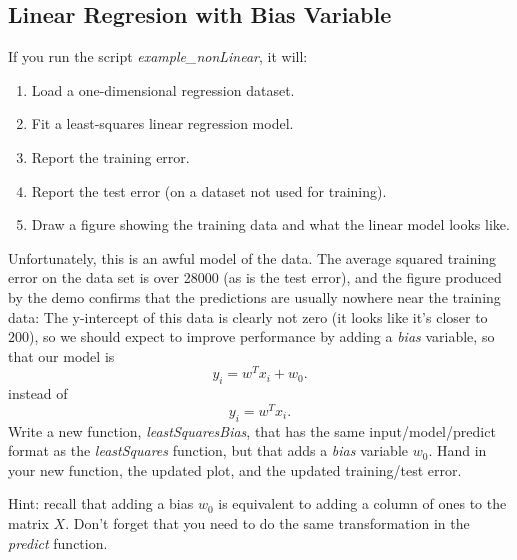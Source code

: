 \documentclass{article}
\def\blu#1{{\color{blu}#1}}
\newcommand{\centerfig}[2]{\begin{center}\texttt{[image: a2f/\#2]}\end{center}}
\def\enum#1{\begin{enumerate}#1\end{enumerate}}
\begin{document}

\subsection{Linear Regresion with Bias Variable}

If you run the script \emph{example\_nonLinear}, it will:
\enum{
\item Load a one-dimensional regression dataset.
\item Fit a least-squares linear regression model.
\item Report the training error.
\item Report the test error (on a dataset not used for training).
\item Draw a figure showing the training data and what the linear model looks like.
}
Unfortunately, this is an awful model of the data. The average squared training error on the data set is over 28000 (as is the test error), and the figure produced by the demo confirms that the predictions are usually nowhere near the training data:
The y-intercept of this data is clearly not zero (it looks like it's closer to $200$), so we should expect to improve performance by adding a \emph{bias} variable, so that our model is
\[
y_i = w^Tx_i + w_0.
\]
instead of
\[
y_i = w^Tx_i.
\]
\blu{Write a new function, \emph{leastSquaresBias}, that has the same input/model/predict format as the \emph{leastSquares} function, but that adds a \emph{bias} variable $w_0$. Hand in your new function, the updated plot, and the updated training/test error.}

Hint: recall that adding a bias $w_0$ is equivalent to adding a column of ones to the matrix $X$. Don't forget that you need to do the same transformation in the \emph{predict} function.
\end{document}
